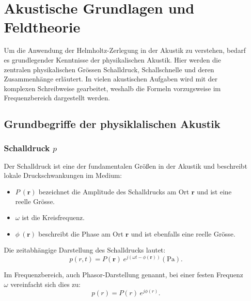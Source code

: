 %
%
%
%
\section{Akustische Grundlagen und Feldtheorie
\label{helmholtz:section:akustische_Grundlagen}}

Um die Anwendung der Helmholtz-Zerlegung in der Akustik zu verstehen, bedarf es grundlegender Kenntnisse der physikalischen Akustik. Hier werden die zentralen physikalischen Grössen Schalldruck, Schallschnelle und deren Zusammenhänge erläutert. In vielen akustischen Aufgaben wird mit der komplexen Schreibweise gearbeitet, weshalb die Formeln vorzugsweise im Frequenzbereich dargestellt werden.

\subsection{Grundbegriffe der physiklalischen Akustik
\label{helmholtz:subsection:Grundbegriffe_Akustik}}

\subsubsection{Schalldruck $p$}
 
\noindent Der Schalldruck ist eine der fundamentalen Größen in der Akustik und beschreibt lokale Druckschwankungen im Medium:
 
\begin{itemize}
\item $P \: (\mathbf{r})$ bezeichnet die Amplitude des Schalldrucks am Ort $\mathbf{r}$ und ist eine reelle Grösse.
\item $\omega$ ist die Kreisfrequenz.
\item $\phi \: (\mathbf{r})$ beschreibt die Phase am Ort $\mathbf{r}$ und ist ebenfalls eine reelle Grösse.
\end{itemize}
 
\noindent Die zeitabhängige Darstellung des Schalldrucks lautet:
\begin{equation}
p(r,t) = P(\mathbf{r}) \: e^{j( \omega t - \phi(\mathbf{r}))} (\si{\pascal}).
\end{equation}
 
\noindent Im Frequenzbereich, auch Phasor-Darstellung genannt, bei einer festen Frequenz $\omega$ vereinfacht sich dies zu:
\begin{equation}
p(r) = P(r) \: e^{j \phi (r)}.
\label{helmholtz:PhasorSchalldruck}
\end{equation}
 
